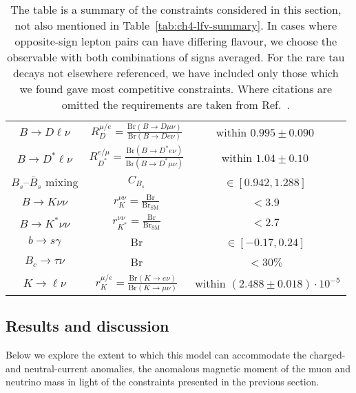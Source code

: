 \begin{table}
\begin{tabular}{ccc}
    $B \to D \ell \nu$               &  $R_{D}^{\mu / e} = \frac{\text{Br}(B \to D \mu \nu)}{\text{Br}(B \to D e \nu)}$  & within $0.995 \pm 0.090$~\cite{Glattauer:2015teq} \\
    $B \to D^* \ell \nu$             &  $R_{D^*}^{e / \mu} = \frac{\text{Br}(B \to D^* e \nu)}{\text{Br}(B \to D^* \mu \nu)}$  & within $1.04 \pm 0.10$~\cite{Abdesselam:2017kjf} \\
    $B_s$--$\bar{B}_s$ mixing        &  $C_{B_s}$  & $\in [0.942, 1.288]$~\cite{Bona:2007vi} \\
    $B \to K \nu \nu$                 &  $r_K^{\nu\nu} = \frac{\text{Br}}{\text{Br}_{\text{SM}}}$ & $< 3.9$~\cite{Grygier:2017tzo} \\
    $B \to K^* \nu \nu$                 &  $r_{K^*}^{\nu\nu} = \frac{\text{Br}}{\text{Br}_{\text{SM}}}$ & $< 2.7$~\cite{Grygier:2017tzo}\\
    $b \to s \gamma$                 &  Br & $\in [-0.17, 0.24]$~\cite{Amhis:2014hma} \\
    $B_c \to \tau \nu$                 &  Br & $< 30 \%$~\cite{Alonso:2016oyd} \\
    $K \to \ell \nu$                 &  $r_K^{\mu/e} = \frac{\text{Br}(K \to e \nu)}{\text{Br}(K \to \mu \nu)}$  & within $(2.488 \pm 0.018) \cdot 10^{-5}$\\
    \bottomrule
  \end{tabular}
  \caption[The table is a summary of the constraints considered in this section,
  not also mentioned in Table~\ref{tab:ch4-lfv-summary}.]{The table is a summary
    of the constraints considered in this section, not also mentioned in
    Table~\ref{tab:ch4-lfv-summary}. In cases where opposite-sign lepton pairs
    can have differing flavour, we choose the observable with both combinations
    of signs averaged. For the rare tau decays not elsewhere referenced, we have
    included only those which we found gave most competitive constraints. Where
    citations are omitted the requirements are taken from
    Ref.~\cite{PhysRevD.98.030001}.}
  \label{tab:ch4-summary}
\end{table}

\subsection{Results and discussion}
\label{sec:ch4-innes-results-and-disc}

Below we explore the extent to which this model can accommodate the charged- and
neutral-current anomalies, the anomalous magnetic moment of the muon and
neutrino mass in light of the constraints presented in the previous section.

